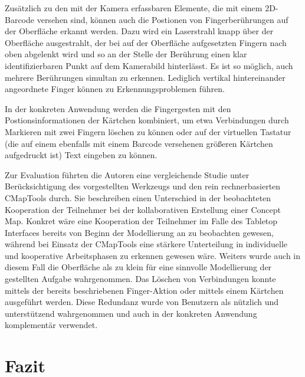 Zusätzlich zu den mit der Kamera erfassbaren Elemente, die mit einem 2D-Barcode versehen sind, können auch die Postionen von Fingerberührungen auf der Oberfläche erkannt werden. Dazu wird ein Laserstrahl knapp über der Oberfläche ausgestrahlt, der bei auf der Oberfläche aufgesetzten Fingern nach oben abgelenkt wird und so an der Stelle der Berührung einen klar identifizierbaren Punkt auf dem Kamerabild hinterlässt. Es ist so möglich, auch mehrere Berührungen simultan zu erkennen. Lediglich vertikal hintereinander angeordnete Finger können zu Erkennungsproblemen führen.

In der konkreten Anwendung werden die Fingergesten mit den Postionsinformationen der Kärtchen kombiniert, um etwa Verbindungen durch Markieren mit zwei Fingern löschen zu können oder auf der virtuellen Tastatur (die auf einem ebenfalls mit einem Barcode versehenen größeren Kärtchen aufgedruckt ist) Text eingeben zu können.

Zur Evaluation führten die Autoren eine vergleichende Studie unter Berücksichtigung des vorgestellten Werkzeugs und den rein rechnerbasierten CMapTools \citep{Canas04} durch. Sie beschreiben einen Unterschied in der beobachteten Kooperation der Teilnehmer bei der kollaborativen Erstellung einer Concept Map. Konkret wäre eine Kooperation der Teilnehmer im Falle des Tabletop Interfaces bereits von Beginn der Modellierung an zu beobachten gewesen, während bei Einsatz der CMapTools eine stärkere Unterteilung in individuelle und kooperative Arbeitsphasen zu erkennen gewesen wäre. Weiters wurde auch in diesem Fall die Oberfläche als zu klein für eine sinnvolle Modellierung der gestellten Aufgabe wahrgenommen. Das Löschen von Verbindungen konnte mittels der bereits beschriebenen Finger-Aktion oder mittels einem Kärtchen ausgeführt werden. Diese Redundanz wurde von Benutzern als nützlich und unterstützend wahrgenommen und auch in der konkreten Anwendung komplementär verwendet.





\section{Fazit} %
\label{sec:impl_ueberblick_fazit}


